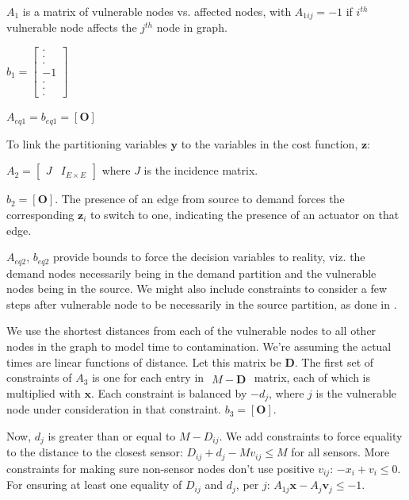 \documentclass[authoryear,preprint,review,12pt]{elsarticle}
\begin{document}
$A_{1}$ is a matrix of vulnerable nodes vs. affected nodes, with
$A_{1ij}=-1$ if $i^{th}$ vulnerable node affects the $j^{th}$ node
in graph.

$b_{1}=\left[\begin{array}{c}
.\\
.\\
.\\
-1\\
.\\
.\\
.
\end{array}\right]$

$A_{eq1}=b_{eq1}=\mathbf{\left[O\right]}$

To link the partitioning variables $\mathbf{y}$ to the variables
in the cost function, $\mathbf{z}$:

$A_{2}=\left[\begin{array}{cc}
J & I_{E\times E}\end{array}\right]$ where $J$ is the incidence matrix.

$b_{2}=\left[\mathbf{O}\right]$. The presence of an edge from source
to demand forces the corresponding $\mathbf{z}_{i}$ to switch to
one, indicating the presence of an actuator on that edge.

$A_{eq2}$, $b_{eq2}$ provide bounds to force the decision variables
to reality, viz. the demand nodes necessarily being in the demand
partition and the vulnerable nodes being in the source. We might also
include constraints to consider a few steps after vulnerable node
to be necessarily in the source partition, as done in \cite{palleti_actuator_2018}.

We use the shortest distances from each of the vulnerable nodes to
all other nodes in the graph to model time to contamination. We're
assuming the actual times are linear functions of distance. Let this
matrix be $\mathbf{D}$. The first set of constraints of $A_{3}$
is one for each entry in $\begin{array}{c}
M-\mathbf{D}\end{array}$ matrix, each of which is multiplied with $\mathbf{x}$. Each constraint
is balanced by $-d_{j}$, where $j$ is the vulnerable node under
consideration in that constraint. $b_{3}=\left[\mathbf{O}\right].$

Now, $d_{j}$ is greater than or equal to $M-D$$_{ij}$. We add constraints
to force equality to the distance to the closest sensor: $D_{ij}+d_{j}-Mv_{ij}\leq M$
for all sensors. \label{v-inequality-at-sensor-nodes}More constraints
for making sure non-sensor nodes don't use positive $v_{ij}$: $-x_{i}+v_{i}\leq0$.
For ensuring at least one equality of $D{}_{ij}$ and $d_{j}$, per
$j$: $A_{1j}\mathbf{x}-A_{j}\mathbf{v}_{j}\leq-1$.
\end{document}
